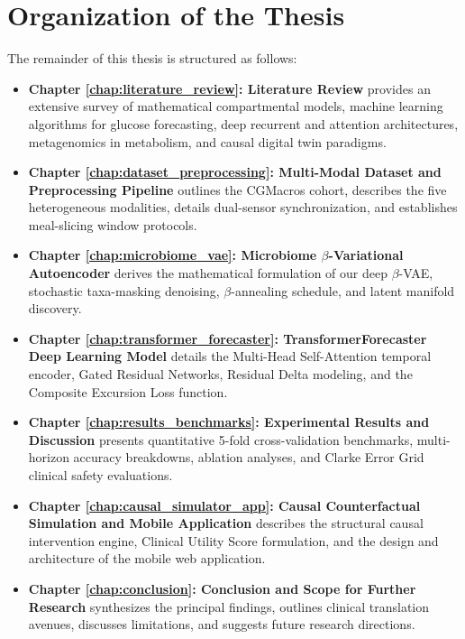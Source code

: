 \section{Organization of the Thesis}
The remainder of this thesis is structured as follows:
\begin{itemize}
    \item \textbf{Chapter \ref{chap:literature_review}: Literature Review} provides an extensive survey of mathematical compartmental models, machine learning algorithms for glucose forecasting, deep recurrent and attention architectures, metagenomics in metabolism, and causal digital twin paradigms.
    \item \textbf{Chapter \ref{chap:dataset_preprocessing}: Multi-Modal Dataset and Preprocessing Pipeline} outlines the CGMacros cohort, describes the five heterogeneous modalities, details dual-sensor synchronization, and establishes meal-slicing window protocols.
    \item \textbf{Chapter \ref{chap:microbiome_vae}: Microbiome $\beta$-Variational Autoencoder} derives the mathematical formulation of our deep $\beta$-VAE, stochastic taxa-masking denoising, $\beta$-annealing schedule, and latent manifold discovery.
    \item \textbf{Chapter \ref{chap:transformer_forecaster}: TransformerForecaster Deep Learning Model} details the Multi-Head Self-Attention temporal encoder, Gated Residual Networks, Residual Delta modeling, and the Composite Excursion Loss function.
    \item \textbf{Chapter \ref{chap:results_benchmarks}: Experimental Results and Discussion} presents quantitative 5-fold cross-validation benchmarks, multi-horizon accuracy breakdowns, ablation analyses, and Clarke Error Grid clinical safety evaluations.
    \item \textbf{Chapter \ref{chap:causal_simulator_app}: Causal Counterfactual Simulation and Mobile Application} describes the structural causal intervention engine, Clinical Utility Score formulation, and the design and architecture of the mobile web application.
    \item \textbf{Chapter \ref{chap:conclusion}: Conclusion and Scope for Further Research} synthesizes the principal findings, outlines clinical translation avenues, discusses limitations, and suggests future research directions.
\end{itemize}
